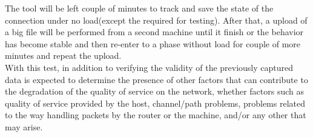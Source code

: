 The tool will be left couple of minutes to track and save the state of the
connection under no load(except the required for testing). After that, a upload
of a big file will be performed from a second machine until it finish or the
behavior has become stable and then re-enter to a phase without load for couple
of more minutes and repeat the upload.\\

With this test, in addition to verifying the validity of the previously captured
data is expected to determine the presence of other factors that can contribute
to the degradation of the quality of service on the network, whether factors
such as quality of service provided by the host, channel/path problems, problems
related to the way handling packets by the router or the machine, and/or any
other that may arise.\\
